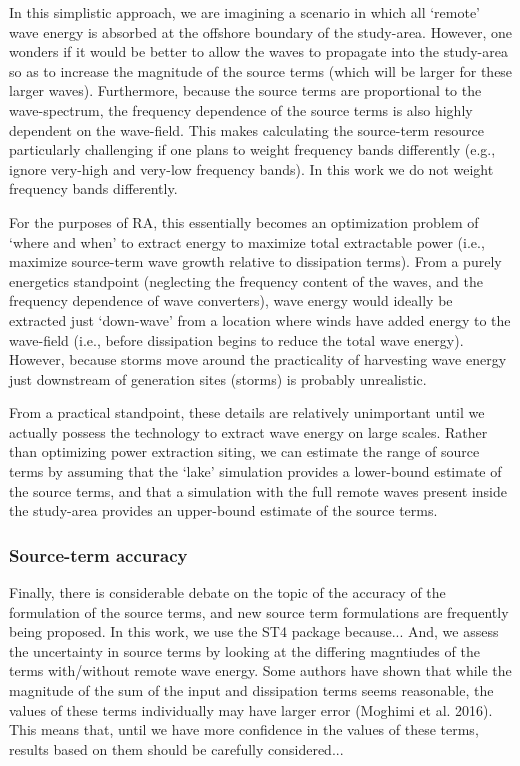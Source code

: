 In this simplistic approach, we are imagining a scenario in which all ‘remote’ wave energy is absorbed at the offshore boundary of the study-area. However, one wonders if it would be better to allow the waves to propagate into the study-area so as to increase the magnitude of the source terms (which will be larger for these larger waves). Furthermore, because the source terms are proportional to the wave-spectrum, the frequency dependence of the source terms is also highly dependent on the wave-field. This makes calculating the source-term resource particularly challenging if one plans to weight frequency bands differently (e.g., ignore very-high and very-low frequency bands). In this work we do not weight frequency bands differently.

For the purposes of RA, this essentially becomes an optimization problem of ‘where and when’ to extract energy to maximize total extractable power (i.e., maximize source-term wave growth relative to dissipation terms). From a purely energetics standpoint (neglecting the frequency content of the waves, and the frequency dependence of wave converters), wave energy would ideally be extracted just ‘down-wave’ from a location where winds have added energy to the wave-field (i.e., before dissipation begins to reduce the total wave energy). However, because storms move around the practicality of harvesting wave energy just downstream of generation sites (storms) is probably unrealistic.

From a practical standpoint, these details are relatively unimportant until we actually possess the technology to extract wave energy on large scales. Rather than optimizing power extraction siting, we can estimate the range of source terms by assuming that the ‘lake’ simulation provides a lower-bound estimate of the source terms, and that a simulation with the full remote waves present inside the study-area provides an upper-bound estimate of the source terms.

\subsubsection{Source-term accuracy}

Finally, there is considerable debate on the topic of the accuracy of the formulation of the source terms, and new source term formulations are frequently being proposed. In this work, we use the ST4 package because... And, we assess the uncertainty in source terms by looking at the differing magntiudes of the terms with/without remote wave energy. Some authors have shown that while the magnitude of the sum of the input and dissipation terms seems reasonable, the values of these terms individually may have larger error (Moghimi et al. 2016). This means that, until we have more confidence in the values of these terms, results based on them should be carefully considered...

